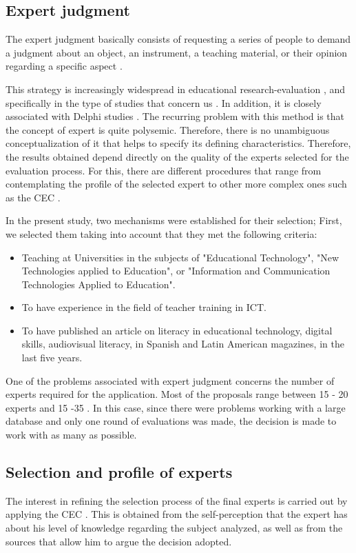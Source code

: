 \documentclass{textolivre}
\begin{document}
\subsection{Expert judgment}\label{sec-expert}
The expert judgment basically consists of requesting a series of people to
demand a judgment about an object, an instrument, a teaching material, or their
opinion regarding a specific aspect \cite{caberoLlorente2013}.

This strategy is increasingly widespread in educational research-evaluation
\cite{robles2015,galiciaAlarcn2017}, and specifically in the
type of studies that concern us \cite{caberoLlorente2013}. In addition, it is
closely associated with Delphi studies \cite{lopezGomez2017}. The recurring
problem with this method is that the concept of expert is quite polysemic.
Therefore, there is no unambiguous conceptualization of it that helps to
specify its defining characteristics. Therefore, the results obtained depend
directly on the quality of the experts selected for the evaluation process. For
this, there are different procedures that range from contemplating the profile
of the selected expert to other more complex ones such as the CEC \cite{caberoBarroso2013,caberoAlmenara2014,lopezGomez2017}.

In the present study, two mechanisms were established for their selection;
First, we selected them taking into account that they met the following
criteria:
\begin{itemize}
\item Teaching at Universities in the subjects of "Educational Technology",
"New Technologies applied to Education", or "Information and Communication
Technologies Applied to Education".
\item To have experience in the field of teacher training in ICT.
\item To have published an article on literacy in educational technology,
digital skills, audiovisual literacy, in Spanish and Latin American magazines,
in the last five years.
\end{itemize}

One of the problems associated with expert judgment concerns the number of
experts required for the application. Most of the proposals range between 15 -
20 experts \cite{malla1978} and 15 -35 \cite{landeta1999}. In this case,
since there were problems working with a large database and only one round of
evaluations was made, the decision is made to work with as many as possible.


\subsection{Selection and profile of experts}\label{sec-selection}
The interest in refining the selection process of the final experts is carried
out by applying the CEC \cite{caberoBarroso2013,caberoAlmenara2014,lopezGomez2017}.
This is obtained from the self-perception that the expert has
about his level of knowledge regarding the subject analyzed, as well as from
the sources that allow him to argue the decision adopted.
\end{document}

